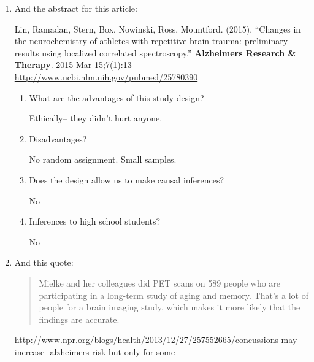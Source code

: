 \begin{enumerate}
  \item And the abstract for this article:

Lin, Ramadan, Stern, Box, Nowinski, Ross, Mountford. (2015).
``Changes in the neurochemistry of athletes with repetitive brain trauma: preliminary results using localized correlated spectroscopy.''
{\bf Alzheimers Research \& Therapy}. 2015 Mar 15;7(1):13
\url{http://www.ncbi.nlm.nih.gov/pubmed/25780390}

\begin{enumerate}
\item  What are the advantages of this study design?
\begin{students}
 \vfill
\end{students}

\begin{key}
 Ethically-- they didn't hurt anyone.
\end{key}

\item Disadvantages?
\begin{students}
 \vfill
\end{students}

\begin{key}
No random assignment.  Small samples.
\end{key}

\item Does the design allow us to make causal
    inferences?
\begin{students}
 \vspace{.6cm}
\end{students}

\begin{key} No
\end{key}



\item Inferences to high school students?
\begin{students}
\vspace*{.6cm}
\newpage
\end{students}

\begin{key} No
\end{key}

\end{enumerate}

\item And this quote:
{\footnotesize
  \begin{quotation}
Mielke and her colleagues did PET scans on 589 people who are
participating in a long-term study of aging and memory. That's a lot
of people for a brain imaging study, which makes it more likely that
the findings are accurate. 
  \end{quotation}
}
\url{http://www.npr.org/blogs/health/2013/12/27/257552665/concussions-may-increase-}
\url{alzheimers-risk-but-only-for-some}


\end{enumerate}
